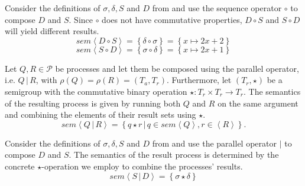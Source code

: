 \begin{example}
\label{exp:sem_sequence}
Consider the definitions of $\sigma, \delta, S$ and $D$ from  and use the sequence operator $\circ$ to compose $D$ and $S$. Since $\circ$ does not have commutative properties, $D \circ S$ and $S \circ D$ will yield different results.
  \begin{equation}
    sem \left\langle D \circ S \right\rangle = \left\{ \delta \circ \sigma \right\} = \left\{ x \mapsto 2x+2 \right\}
  \end{equation}
  \begin{equation}
    sem \left\langle S \circ D \right\rangle = \left\{ \sigma \circ \delta \right\} = \left\{ x \mapsto 2x+1 \right\}
  \end{equation}
  \hfill\qedsymbol
\end{example}


\begin{definition}
\label{def:sem_parallel}
Let $Q, R \in \mathcal{P}$ be processes and let them be composed using the parallel operator, i.e. $Q \,|\, R$, with $\rho \left( Q \right) = \rho \left( R \right) = \left( T_a, T_r \right)$. Furthermore, let $\left( T_r, \star \right)$ be a semigroup with the commutative binary operation $\star \colon T_r \times T_r \to T_r$. The semantics of the resulting process is given by running both $Q$ and $R$ on the same argument and combining the elements of their result sets using $\star$.
  \begin{equation}
    \label{eqn:sem_parallel}
    sem \left\langle Q \,|\, R \right\rangle = \left\{ q \star r \,|\, q \in sem \left\langle Q \right\rangle, r \in \left\langle R \right\rangle \right\}.
  \end{equation}
  \hfill\qedsymbol
\end{definition}

\begin{example}
\label{exp:sem_parallel}
Consider the definitions of $\sigma, \delta, S$ and $D$ from  and use the parallel operator $|$ to compose $D$ and $S$. The semantics of the result process is determined by the concrete $\star$-operation we employ to combine the processes' results.
  \begin{equation}
    sem \left\langle S \,|\, D \right\rangle = \left\{ \sigma \star \delta \right\}
  \end{equation}
  \hfill\qedsymbol
\end{example}

